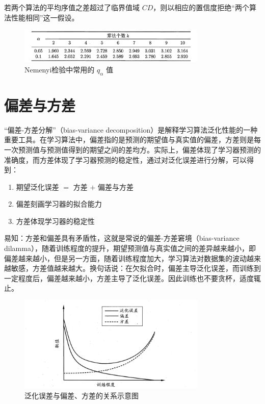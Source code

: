 \documentclass[12pt, a4paper]{article} %
\begin{document}
若两个算法的平均序值之差超过了临界值域 $CD$，则以相应的置信度拒绝“两个算法性能相同”这一假设。

\begin{figure}[H]
    \centering
    \includegraphics[width=0.8\textwidth]{../img/2-13-Nemenyi检验中常用的值.png}
    \caption{Nemenyi检验中常用的 $q_{\alpha}$ 值}
    \label{fig:Nemenyi检验中常用的值}
\end{figure}

\section{偏差与方差}

“偏差-方差分解”（bias-variance decomposition）是解释学习算法泛化性能的一种重要工具。在学习算法中，偏差指的是预测的期望值与真实值的偏差，方差则是每一次预测值与预测值得到的期望之间的差均方。实际上，偏差体现了学习器预测的准确度，而方差体现了学习器预测的稳定性，通过对泛化误差进行分解，可以得到：

\begin{enumerate}[\hspace*{2em} i.]
    \item 期望泛化误差 $=$ 方差 $+$ 偏差与方差
    \item 偏差刻画学习器的拟合能力
    \item 方差体现学习器的稳定性
\end{enumerate}

易知：方差和偏差具有矛盾性，这就是常说的偏差-方差窘境（bias-variance dilamma），随着训练程度的提升，期望预测值与真实值之间的差异越来越小，即偏差越来越小，但是另一方面，随着训练程度加大，学习算法对数据集的波动越来越敏感，方差值越来越大。换句话说：在欠拟合时，偏差主导泛化误差，而训练到一定程度后，偏差越来越小，方差主导了泛化误差。因此训练也不要贪杯，适度辄止。

\begin{figure}[H]
    \centering
    \includegraphics[width=0.8\textwidth]{../img/2-14-泛化误差与偏差、方差的关系示意图.png}
    \caption{泛化误差与偏差、方差的关系示意图}
    \label{fig:泛化误差与偏差、方差的关系示意图}
\end{figure}
\end{document}
